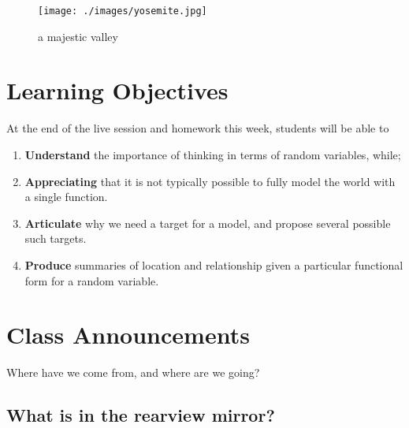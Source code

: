 \documentclass[
]{book}
\providecommand{\tightlist}{%
  \setlength{\itemsep}{0pt}\setlength{\parskip}{0pt}}
\theoremstyle{definition}
\theoremstyle{definition}
\theoremstyle{definition}
\theoremstyle{definition}
\theoremstyle{remark}
\begin{document}
\begin{figure}
\centering
\texttt{[image: ./images/yosemite.jpg]}
\caption{a majestic valley}
\end{figure}

\hypertarget{learning-objectives-2}{%
\section{Learning Objectives}\label{learning-objectives-2}}

At the end of the live session and homework this week, students will be able to

\begin{enumerate}
\def\labelenumi{\arabic{enumi}.}
\tightlist
\item
  \textbf{Understand} the importance of thinking in terms of random variables, while;
\item
  \textbf{Appreciating} that it is not typically possible to fully model the world with a single function.
\item
  \textbf{Articulate} why we need a target for a model, and propose several possible such targets.
\item
  \textbf{Produce} summaries of location and relationship given a particular functional form for a random variable.
\end{enumerate}

\hypertarget{class-announcements-1}{%
\section{Class Announcements}\label{class-announcements-1}}

Where have we come from, and where are we going?

\hypertarget{what-is-in-the-rearview-mirror}{%
\subsection{What is in the rearview mirror?}\label{what-is-in-the-rearview-mirror}}
\end{document}
